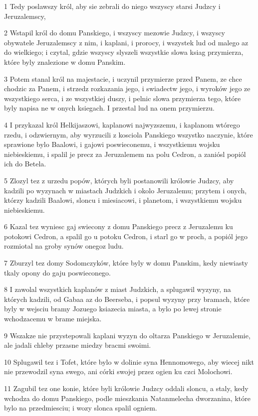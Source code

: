 \par 1 Tedy poslawszy król, aby sie zebrali do niego wszyscy starsi Judzcy i Jeruzalemscy,
\par 2 Wstapil król do domu Panskiego, i wszyscy mezowie Judzcy, i wszyscy obywatele Jeruzalemscy z nim, i kaplani, i prorocy, i wszystek lud od malego az do wielkiego; i czytal, gdzie wszyscy slyszeli wszystkie slowa ksiag przymierza, które byly znalezione w domu Panskim.
\par 3 Potem stanal król na majestacie, i uczynil przymierze przed Panem, ze chce chodzic za Panem, i strzedz rozkazania jego, i swiadectw jego, i wyroków jego ze wszystkiego serca, i ze wszystkiej duszy, i pelnic slowa przymierza tego, które byly napisa ne w onych ksiegach. I przestal lud na onem przymierzu.
\par 4 I przykazal król Helkijaszowi, kaplanowi najwyzszemu, i kaplanom wtórego rzedu, i odzwiernym, aby wyrzucili z kosciola Panskiego wszystko naczynie, które sprawione bylo Baalowi, i gajowi poswieconemu, i wszystkiemu wojsku niebieskiemu, i spalil je precz za Jeruzalemem na polu Cedron, a zaniósl popiól ich do Betela.
\par 5 Zlozyl tez z urzedu popów, których byli postanowili królowie Judzcy, aby kadzili po wyzynach w miastach Judzkich i okolo Jeruzalemu; przytem i onych, którzy kadzili Baalowi, sloncu i miesiacowi, i planetom, i wszystkiemu wojsku niebieskiemu.
\par 6 Kazal tez wyniesc gaj swiecony z domu Panskiego precz z Jeruzalemu ku potokowi Cedron, a spalil go u potoku Cedron, i starl go w proch, a popiól jego rozmiotal na groby synów onegoz ludu.
\par 7 Zburzyl tez domy Sodomczyków, które byly w domu Panskim, kedy niewiasty tkaly opony do gaju poswieconego.
\par 8 I zawolal wszystkich kaplanów z miast Judzkich, a splugawil wyzyny, na których kadzili, od Gabaa az do Beerseba, i popsul wyzyny przy bramach, które byly w wejsciu bramy Jozuego ksiazecia miasta, a bylo po lewej stronie wchodzacemu w brame miejska.
\par 9 Wszakze nie przystepowali kaplani wyzyn do oltarza Panskiego w Jeruzalemie, ale jadali chleby przasne miedzy bracmi swoimi.
\par 10 Splugawil tez i Tofet, które bylo w dolinie syna Hennomowego, aby wiecej nikt nie przewodzil syna swego, ani córki swojej przez ogien ku czci Molochowi.
\par 11 Zagubil tez one konie, które byli królowie Judzcy oddali sloncu, a staly, kedy wchodza do domu Panskiego, podle mieszkania Natanmelecha dworzanina, które bylo na przedmiesciu; i wozy slonca spalil ogniem.
